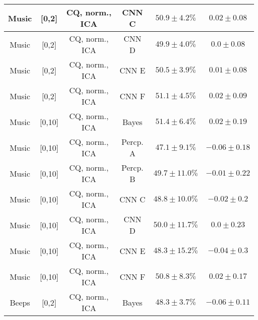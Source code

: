 \begin{table}[!htb]
{\begin{tabular}{c|c|c|c|c|c}
    Music               & [0,2]                                         & CQ, norm., ICA             & CNN C                 &  $50.9 \pm 4.2\%$     & $0.02 \pm 0.08$\\ 
    \hline
    Music               & [0,2]                                         & CQ, norm., ICA             & CNN D                 &  $49.9 \pm 4.0\%$     & $0.0 \pm 0.08$\\   
    \hline
    Music               & [0,2]                                         & CQ, norm., ICA             & CNN E                 &  $50.5 \pm 3.9\%$     & $0.01 \pm 0.08$\\  
    \hline
    Music               & [0,2]                                         & CQ, norm., ICA             & CNN F                 &  $51.1 \pm 4.5\%$     & $0.02 \pm 0.09$\\  
    \hline
    Music               & [0,10]                                        & CQ, norm., ICA             & Bayes                 &  $51.4 \pm 6.4\%$     & $0.02 \pm 0.19$\\  
    \hline
    Music               & [0,10]                                        & CQ, norm., ICA             & Percp. A              &  $47.1 \pm 9.1\%$     & $-0.06 \pm 0.18$\\  
    \hline
    Music               & [0,10]                                        & CQ, norm., ICA             & Percp. B              &  $49.7 \pm 11.0\%$    & $-0.01 \pm 0.22$\\ 
    \hline
    Music               & [0,10]                                        & CQ, norm., ICA             & CNN C                 &  $48.8 \pm 10.0\%$    & $-0.02 \pm 0.2$\\   
    \hline
    Music               & [0,10]                                        & CQ, norm., ICA             & CNN D                 &  $50.0 \pm 11.7\%$    & $0.0 \pm 0.23$\\    
    \hline
    Music               & [0,10]                                        & CQ, norm., ICA             & CNN E                 &  $48.3 \pm 15.2\%$    & $-0.04 \pm 0.3$\\  
    \hline
    Music               & [0,10]                                        & CQ, norm., ICA             & CNN F                 &  $50.8 \pm 8.3\%$     & $0.02 \pm 0.17$\\  
    \hline \hline
    Beeps               & [0,2]                                         & CQ, norm., ICA             & Bayes                 &  $48.3 \pm 3.7\%$     & $-0.06 \pm 0.11$\\ 

\end{tabular}}
\end{table}
